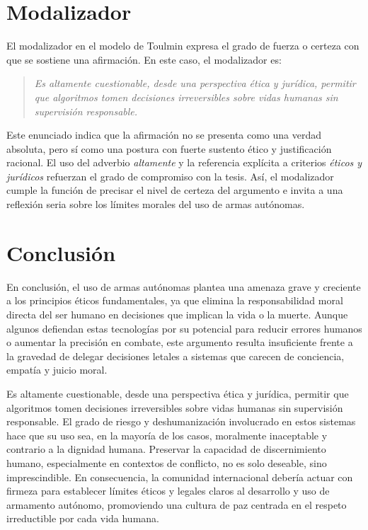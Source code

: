 \documentclass[12pt]{article}
\begin{document}
\section*{Modalizador}

El modalizador en el modelo de Toulmin expresa el grado de fuerza o certeza con que se sostiene una afirmación. En este caso, el modalizador es:

\begin{quote}
\textit{Es altamente cuestionable, desde una perspectiva ética y jurídica, permitir que algoritmos tomen decisiones irreversibles sobre vidas humanas sin supervisión responsable.}
\end{quote}

Este enunciado indica que la afirmación no se presenta como una verdad absoluta, pero sí como una postura con fuerte sustento ético y justificación racional. El uso del adverbio \textit{altamente} y la referencia explícita a criterios \textit{éticos y jurídicos} refuerzan el grado de compromiso con la tesis. Así, el modalizador cumple la función de precisar el nivel de certeza del argumento e invita a una reflexión seria sobre los límites morales del uso de armas autónomas.

\section*{Conclusión}

En conclusión, el uso de armas autónomas plantea una amenaza grave y creciente a los principios éticos fundamentales, ya que elimina la responsabilidad moral directa del ser humano en decisiones que implican la vida o la muerte. Aunque algunos defiendan estas tecnologías por su potencial para reducir errores humanos o aumentar la precisión en combate, este argumento resulta insuficiente frente a la gravedad de delegar decisiones letales a sistemas que carecen de conciencia, empatía y juicio moral.

Es altamente cuestionable, desde una perspectiva ética y jurídica, permitir que algoritmos tomen decisiones irreversibles sobre vidas humanas sin supervisión responsable. El grado de riesgo y deshumanización involucrado en estos sistemas hace que su uso sea, en la mayoría de los casos, moralmente inaceptable y contrario a la dignidad humana. Preservar la capacidad de discernimiento humano, especialmente en contextos de conflicto, no es solo deseable, sino imprescindible. En consecuencia, la comunidad internacional debería actuar con firmeza para establecer límites éticos y legales claros al desarrollo y uso de armamento autónomo, promoviendo una cultura de paz centrada en el respeto irreductible por cada vida humana.
\end{document}
